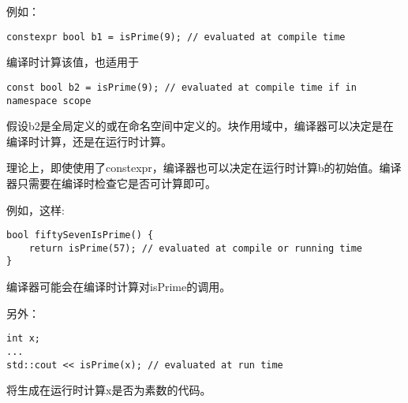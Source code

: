 例如：

\begin{lstlisting}[style=styleCXX]
constexpr bool b1 = isPrime(9); // evaluated at compile time
\end{lstlisting}

编译时计算该值，也适用于

\begin{lstlisting}[style=styleCXX]
const bool b2 = isPrime(9); // evaluated at compile time if in namespace scope
\end{lstlisting}

假设b2是全局定义的或在命名空间中定义的。块作用域中，编译器可以决定是在编译时计算，还是在运行时计算。

\begin{tcolorbox}[colback=webgreen!5!white,colframe=webgreen!75!black]
\hspace*{0.75cm}理论上，即使使用了constexpr，编译器也可以决定在运行时计算b的初始值。编译器只需要在编译时检查它是否可计算即可。
\end{tcolorbox}

例如，这样:

\begin{lstlisting}[style=styleCXX]
bool fiftySevenIsPrime() {
	return isPrime(57); // evaluated at compile or running time
}
\end{lstlisting}

编译器可能会在编译时计算对isPrime的调用。

另外：

\begin{lstlisting}[style=styleCXX]
int x;
...
std::cout << isPrime(x); // evaluated at run time
\end{lstlisting}

将生成在运行时计算x是否为素数的代码。

